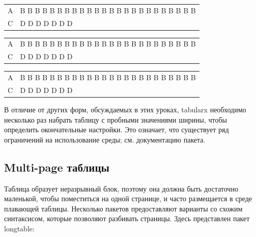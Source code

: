 \documentclass{article}
\begin{document}
  \begin{center}
  \begin{tabular}{lp{2cm}}
  \hline
    A & B B B B B B B B B B B B B B B B B B B B B B B B\\
    C & D D D D D D D\\
  \hline
  \end{tabular}
  \end{center}
  \begin{center}
  \begin{tabularx}{.5\textwidth}{lX}
  \hline
    A & B B B B B B B B B B B B B B B B B B B B B B B B\\
    C & D D D D D D D\\
  \hline
  \end{tabularx}
  \end{center}
  \begin{center}
  \begin{tabularx}{\textwidth}{lX}
  \hline
    A & B B B B B B B B B B B B B B B B B B B B B B B B\\
    C & D D D D D D D\\
  \hline
  \end{tabularx}
  \end{center}

  \smallskip

  В отличие от других форм, обсуждаемых в этих уроках, tabularx необходимо несколько раз набрать таблицу с пробными значениями ширины, чтобы определить окончательные настройки. Это означает,
  что существует ряд ограничений на использование среды; см. документацию пакета.





  \subsection{Multi-page таблицы}
  \label{subsec:width}
  
  Таблица образует неразрывный блок, поэтому она должна быть достаточно маленькой, чтобы поместиться на одной странице,
  и часто размещается в среде плавающей таблицы.
  Несколько пакетов предоставляют варианты со схожим синтаксисом, которые позволяют разбивать страницы.
  Здесь представлен пакет longtable:


  \smallskip
\end{document}
